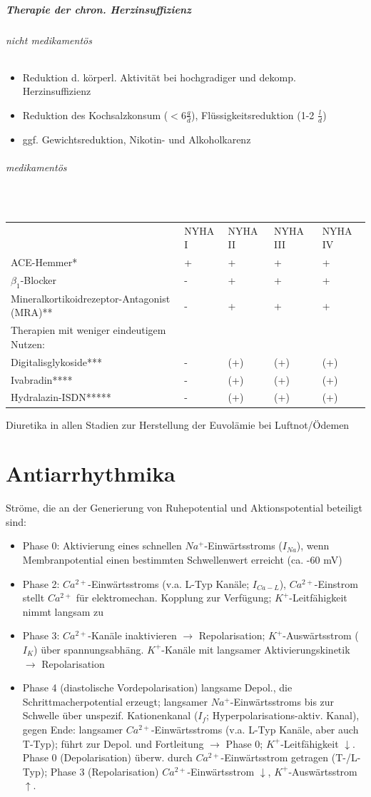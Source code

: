 \documentclass[10pt,a4paper]{report}
\begin{document}
\paragraph{Therapie der chron. Herzinsuffizienz}
\subparagraph{nicht medikamentös}
\begin{itemize}
	\item Reduktion d. körperl. Aktivität bei hochgradiger und dekomp.  Herzinsuffizienz
	\item Reduktion des Kochsalzkonsum ($<6\frac{g}{d}$), Flüssigkeitsreduktion (1-2 $\frac{l}{d}$)
	\item ggf. Gewichtsreduktion, Nikotin- und Alkoholkarenz
\end{itemize}
\subparagraph{medikamentös} \mbox{} \\
\begin{tabularx}{\textwidth}{XXXXX}
&NYHA I&NYHA II&NYHA III&NYHA IV\\
ACE-Hemmer*&+&+&+&+\\
$\beta_1$-Blocker&-&+&+&+\\
Mineralkortikoidrezeptor-Antagonist (MRA)**&-&+&+&+\\
Therapien mit weniger eindeutigem Nutzen:&&&&\\
Digitalisglykoside***&-&(+)&(+)&(+)\\
Ivabradin****&-&(+)&(+)&(+)\\
Hydralazin-ISDN*****&-&(+)&(+)&(+)\\
\end{tabularx}
Diuretika in allen Stadien zur Herstellung der Euvolämie bei Luftnot/Ödemen
\chapter{Antiarrhythmika}
Ströme, die an der Generierung von Ruhepotential und Aktionspotential beteiligt sind: 
\begin{itemize}
	\item Phase 0: Aktivierung eines schnellen $Na^+$-Einwärtsstroms ($I_{Na}$), wenn Membranpotential einen bestimmten Schwellenwert erreicht  (ca. -60 mV)
	\item Phase 2: $Ca^{2+}$-Einwärtsstroms (v.a. L-Typ Kanäle; $I_{Ca-L}$), $Ca^{2+}$-Einstrom stellt $Ca^{2+}$ für elektromechan. Kopplung zur Verfügung; $K^+$-Leitfähigkeit nimmt langsam zu
	\item Phase 3: $Ca^{2+}$-Kanäle inaktivieren $\rightarrow$ Repolarisation; $K^+$-Auswärtsstrom ($I_K$) über spannungsabhäng. $K^+$-Kanäle mit langsamer Aktivierungskinetik $\rightarrow$ Repolarisation 
	\item Phase 4 (diastolische Vordepolarisation) langsame Depol., die Schrittmacherpotential erzeugt; langsamer $Na^+$-Einwärtsstroms bis zur Schwelle über unspezif. Kationenkanal ($I_f$; Hyperpolarisations-aktiv. Kanal), gegen Ende: langsamer $Ca^{2+}$-Einwärtsstroms (v.a. L-Typ Kanäle, aber auch T-Typ); führt zur Depol. und Fortleitung  $\rightarrow$ Phase 0;
$K^+$-Leitfähigkeit $\downarrow$. Phase 0 (Depolarisation) überw. durch $Ca^{2+}$-Einwärtsstrom getragen (T-/L-Typ); Phase 3 (Repolarisation) $Ca^{2+}$-Einwärtsstrom $\downarrow$, $K^+$-Auswärtsstrom $\uparrow$. 
\end{itemize}
\end{document}

